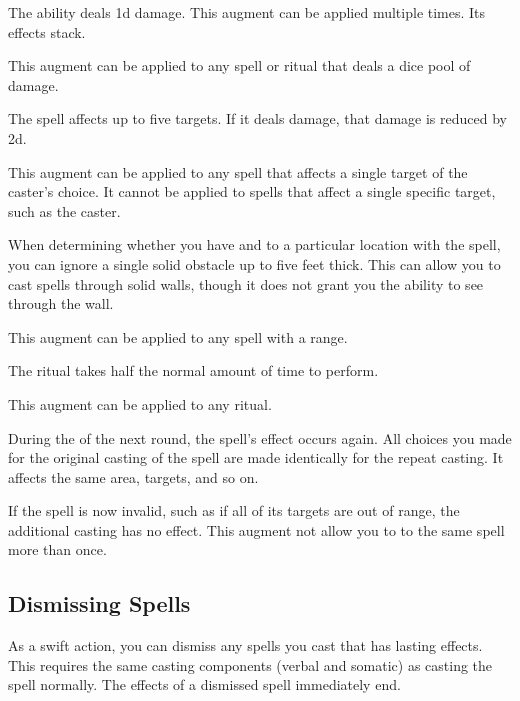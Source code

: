              The ability deals \plus1d damage.
            This augment can be applied multiple times.
            Its effects stack.
            \par This augment can be applied to any spell or ritual that deals a dice pool of damage.

             The spell affects up to five targets.
            If it deals damage, that damage is reduced by \minus2d.
            \par This augment can be applied to any spell that affects a single target of the caster's choice.
            It cannot be applied to spells that affect a single specific target, such as the caster.

             When determining whether you have  and  to a particular location with the spell, you can ignore a single solid obstacle up to five feet thick.
            This can allow you to cast spells through solid walls, though it does not grant you the ability to see through the wall.
            \par This augment can be applied to any spell with a range.

             The ritual takes half the normal amount of time to perform.
            \par This augment can be applied to any ritual.

             During the  of the next round, the spell's effect occurs again.
            All choices you made for the original casting of the spell are made identically for the repeat casting.
            It affects the same area, targets, and so on.

            If the spell is now invalid, such as if all of its targets are out of range, the additional casting has no effect.
            This augment not allow you to  to the same spell more than once.

    \subsection{Dismissing Spells}

        As a swift action, you can dismiss any spells you cast that has lasting effects.
        This requires the same casting components (verbal and somatic) as casting the spell normally.
        The effects of a dismissed spell immediately end.

